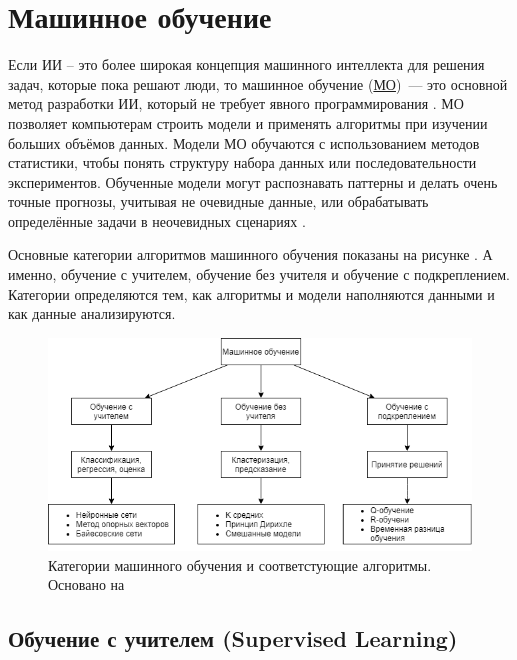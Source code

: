 \section{Машинное обучение} \label{ch1:ml}

Если ИИ – это более широкая концепция машинного интеллекта для решения задач, которые пока решают люди, то машинное обучение (\hyperref[acr:ml]{МО})~--- это основной метод разработки ИИ, который не требует явного программирования \cite{Samuel-SomeStudies}. МО позволяет компьютерам строить модели и применять алгоритмы при изучении больших объёмов данных. Модели МО обучаются с использованием методов статистики, чтобы понять структуру набора данных или последовательности экспериментов. Обученные модели могут распознавать паттерны и делать очень точные прогнозы, учитывая не очевидные данные, или обрабатывать определённые задачи в неочевидных сценариях \cite{bishop06pattern}.

Основные категории алгоритмов машинного обучения показаны на рисунке . А именно, обучение с учителем, обучение без учителя и обучение с подкреплением.
Категории определяются тем, как алгоритмы и модели наполняются данными и как данные анализируются.

\begin{figure}[ht!]
    \center
    \includegraphics [scale=0.60] {my_folder/images/ch1/ML-categories.png}
    \caption{Категории машинного обучения и соответстующие алгоритмы. Основано на \cite{Sultan_2018}}
    \label{fig:ch1-ML-categories}
\end{figure}

\subsection{Обучение с учителем (Supervised Learning)}


